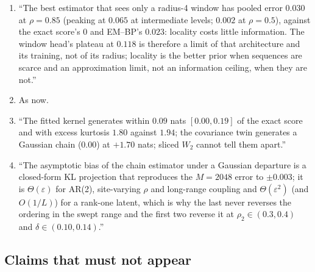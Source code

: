 \begin{enumerate}
\item {} ``The best estimator that sees only a radius-4 window has pooled error $0.030$ at $\rho=0.85$ (peaking at $0.065$ at intermediate levels; $0.002$ at $\rho=0.5$), against the exact score's $0$ and EM--BP's $0.023$: locality costs little information. The window head's plateau at $0.118$ is therefore a limit of that architecture and its training, not of its radius; locality is the better prior when sequences are scarce and an approximation limit, not an information ceiling, when they are not.''
\item {} As now.
\item {} ``The fitted kernel generates within $0.09$ nats $[0.00,0.19]$ of the exact score and with excess kurtosis $1.80$ against $1.94$; the covariance twin generates a Gaussian chain ($0.00$) at $+1.70$ nats; sliced $W_2$ cannot tell them apart.''
\item {} ``The asymptotic bias of the chain estimator under a Gaussian departure is a closed-form KL projection that reproduces the $M=2048$ error to $\pm0.003$; it is $\Theta(\varepsilon)$ for AR(2), site-varying $\rho$ and long-range coupling and $\Theta(\varepsilon^2)$ (and $O(1/L)$) for a rank-one latent, which is why the last never reverses the ordering in the swept range and the first two reverse it at $\rho_2\in(0.3,0.4)$ and $\delta\in(0.10,0.14)$.''
\end{enumerate}

\subsection{Claims that must not appear}

